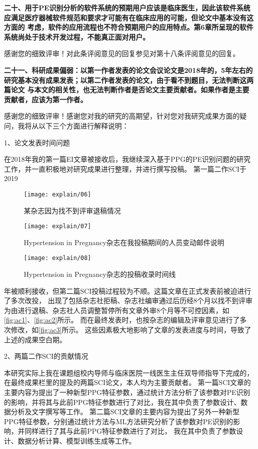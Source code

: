 \textbf{二十、用于PE识别分析的软件系统的预期用户应该是临床医生，因此该软件系统应满足医疗器械软件规范和要求才可能有在临床应用的可能，但论文中基本没有这方面的
考虑，软件的应用流程也不符合预期用户的应用特点。第6章所呈现的软件系统尚处于技术开发过程，不能真正面对用户。}

感谢您的细致评审！对此条评阅意见的回复参见对第十八条评阅意见的回复。

\textbf{二十一、科研成果偏弱：以第一作者发表的论文会议论文是2018年的，5年左右的研究基本没有成果发表；以第二作者发表的论文，由于看不到题目，无法判断这两篇论文
与本文的相关性，也无法判断作者是否论文主要贡献者。如果作者是主要贡献者，应该为第一作者。}

感谢您的细致评审！感谢您对我的研究的高期望，针对您对我研究成果方面的疑问，我将从以下三个方面进行解释说明：

1、论文发表时间问题

在2018年我的第一篇EI文章被接收后，我继续深入基于PPG的PE识别问题的研究工作，并一直积极地对研究成果进行整理，并进行撰写投稿。
第一篇二作SCI于2019
\begin{figure}[htbp]
    \centering
    \texttt{[image: explain/06]}
    \caption[]{\label{fig:ac1}某杂志因为找不到评审退稿情况}
\end{figure}
\begin{figure}[htbp]
    \centering
    \texttt{[image: explain/07]}
    \caption[]{\label{fig:ac2}Hypertension in Pregnancy杂志在我投稿期间的人员变动邮件说明}
\end{figure}

\begin{figure}[htbp]
    \centering
    \texttt{[image: explain/08]}
    \caption[]{\label{fig:ac3}Hypertension in Pregnancy杂志的投稿收录时间线}
\end{figure}

\noindent
年被顺利接收，但第二篇SCI投稿过程较为不顺。这篇文章在正式发表前被迫进行了多次改投，
出现了包括杂志社拒稿、杂志社编审通过后历经8个月以找不到评审为由进行退稿、杂志社人员调整暂停所有文章外审8个月等不可控因素，如\autoref{fig:ac1}、\autoref{fig:ac2}所示。
而在最终发表时，也按杂志的编辑及评审意见进行了多次修改，如\autoref{fig:ac3}所示。
这些因素极大地影响了文章的发表进度与时间，导致了上述的成果空白期。

2、两篇二作SCI的贡献情况

本研究实际上我在课题组校内导师与临床医院一线医生主任双导师指导下完成的，在最终成果栏里的提及的两篇SCI论文，本人均为主要贡献者。
第一篇SCI文章的主要内容为提出了一种新型PPG特征参数，通过统计方法分析了该参数对PE识别的影响，并将其与此前PPG特征参数进行了对比，我在其中负责了参数设计、数据分析及文字撰写等工作。
第二篇SCI文章的主要内容为提出了另外一种新型PPG特征参数，分别通过统计方法与ML方法研究分析了该参数对PE识别的影响，并同样进行了其与此前PPG特征参数进行了对比，
我在其中负责了参数设计、数据分析计算、模型训练生成等工作。

